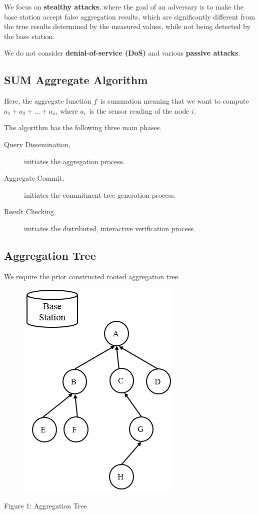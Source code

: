 \documentclass[%
  slidesonly,%
  semlayer%
  ]{seminar}                                  %
\begin{document}
\begin{slide}
      We focus on \textbf{stealthy attacks}, where the goal of an adversary is to make the base station accept false aggregation  results, which are significantly different from the true results determined by the measured values, while not being detected by the base station.
      
      We do not consider \textbf{denial-of-service (DoS)} and various \textbf{passive attacks}.
      \vfill
      \clearpage

    \subsection*{SUM Aggregate Algorithm}
      \vfill
      Here, the aggregate function $f$\ is summation meaning that we want to compute $a_{1} + a_{2} + \dotsc + a_{n}$, where $a_{i}$\ is the sensor reading of the node $i$.
 
      The algorithm has the following three main phases.
      \begin{description}
        \item [Query Dissemination,] initiates the aggregation process.
        \item [Aggregate Commit,] initiates the commitment tree generation process.
        \item [Result Checking,] initiates the distributed, interactive verification process.
      \end{description}
      \vfill
      \clearpage

    \subsection*{Aggregation Tree}
      \vfill
      We require the prior constructed rooted aggregation tree.
      \begin{figure}[h!]
        \centering
        \includegraphics[scale=0.4]{images/aggregation-tree-1.png}
        \label{fig:Aggregation-tree-1}
      \end{figure}
      \begin{center}
        Figure 1: Aggregation Tree
      \end{center}
      \vfill
      \clearpage


\end{slide}
\end{document}
